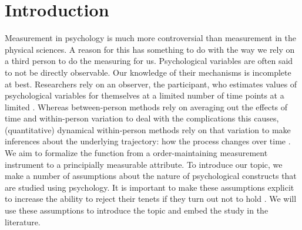 \documentclass[utf8]{FrontiersinVancouver}
\begin{document}
\section{Introduction}
Measurement in psychology is much more controversial than measurement in the physical sciences. A reason for this has something to do with the way we rely on a third person to do the measuring for us. Psychological variables are often said to not be directly observable. Our knowledge of their mechanisms is incomplete at best. Researchers rely on an observer, the participant, who estimates values of psychological variables for themselves at a limited number of time points at a limited . Whereas between-person methods rely on averaging out the effects of time and within-person variation to deal with the complications this causes, (quantitative) dynamical within-person methods rely on that variation to make inferences about the underlying trajectory: how the process changes over time \citep{bokerConsequencesContinuityHunt2002, molenaarManifestoPsychologyIdiographic2004,lamiellStatisticalThinkingPsychology2019}. We aim to formalize the function from a order-maintaining measurement instrument to a principially measurable attribute.
To introduce our topic, we make a number of assumptions about the nature of psychological constructs that are studied using psychology. It is important to make these assumptions explicit to increase the ability to reject their tenets if they turn out not to hold \citep{meehlTheoreticalRisksTabular2004}. We will use these assumptions to introduce the topic and embed the study in the literature.
\end{document}
